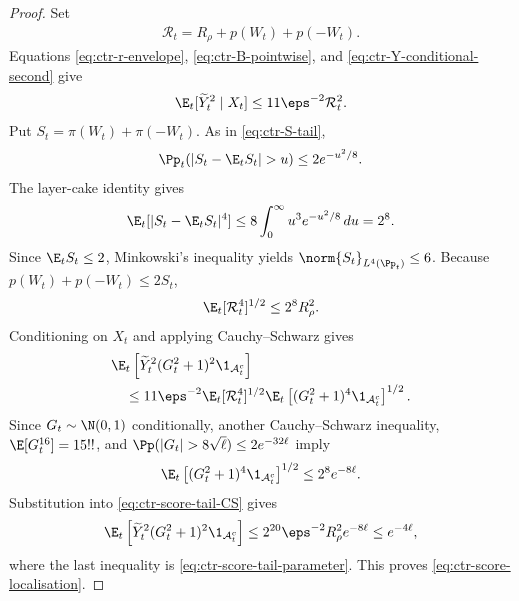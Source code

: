 \begin{proof}
    Set
    \begin{align}
        \mathcal R_t
        =R_\rho+p(W_t)+p(-W_t).
    \end{align}
    Equations \eqref{eq:ctr-r-envelope}, \eqref{eq:ctr-B-pointwise}, and
    \eqref{eq:ctr-Y-conditional-second} give
    \begin{align}
        \E_t[\widetilde Y_t^2\mid X_t]
        \leq11\eps^{-2}\mathcal R_t^2.
        \label{eq:ctr-score-envelope}
    \end{align}
    Put $S_t=\pi(W_t)+\pi(-W_t)$.  As in
    \eqref{eq:ctr-S-tail},
    \begin{align}
        \Pp_t(|S_t-\E_tS_t|>u)\leq2e^{-u^2/8}.
    \end{align}
    The layer-cake identity gives
    \begin{align}
        \E_t[|S_t-\E_tS_t|^4]
        \leq8\int_0^\infty u^3e^{-u^2/8}\,du
        =2^8.
    \end{align}
    Since $\E_tS_t\leq2$, Minkowski's inequality yields
    $\norm{S_t}_{L^4(\Pp_t)}\leq6$.  Because
    $p(W_t)+p(-W_t)\leq2S_t$,
    \begin{align}
        \E_t[\mathcal R_t^4]^{1/2}
        \leq2^8R_\rho^2.
        \label{eq:ctr-R-fourth}
    \end{align}
    Conditioning on $X_t$ and applying Cauchy--Schwarz gives
    \begin{align}
         & \E_t\left[
            \widetilde Y_t^2(G_t^2+1)^2\1_{\mathcal A_t^c}
            \right]
        \\
         & \quad\leq
        11\eps^{-2}\E_t[\mathcal R_t^4]^{1/2}
        \E_t\left[
            (G_t^2+1)^4\1_{\mathcal A_t^c}
            \right]^{1/2}.
        \label{eq:ctr-score-tail-CS}
    \end{align}
    Since $G_t\sim\N(0,1)$ conditionally, another Cauchy--Schwarz
    inequality, $\E[G_t^{16}]=15!!$, and
    $\Pp(|G_t|>8\sqrt\ell)\leq2e^{-32\ell}$ imply
    \begin{align}
        \E_t\left[
            (G_t^2+1)^4\1_{\mathcal A_t^c}
            \right]^{1/2}
        \leq2^8e^{-8\ell}.
    \end{align}
    Substitution into \eqref{eq:ctr-score-tail-CS} gives
    \begin{align}
        \E_t\left[
            \widetilde Y_t^2(G_t^2+1)^2\1_{\mathcal A_t^c}
            \right]
        \leq2^{20}\eps^{-2}R_\rho^2e^{-8\ell}
        \leq e^{-4\ell},
    \end{align}
    where the last inequality is
    \eqref{eq:ctr-score-tail-parameter}.  This proves
    \eqref{eq:ctr-score-localisation}.
\end{proof}

